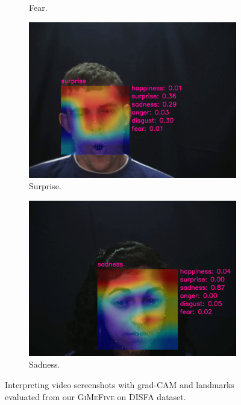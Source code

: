 \begin{figure}[ht]
\begin{subfigure}{0.49\linewidth}
    \caption{Fear.}
    \label{fig:v2}
  \end{subfigure}
  \hfill
  \begin{subfigure}{0.49\linewidth}
    \includegraphics[width=\linewidth]{GiMeFive03.png}
    \caption{Surprise.}
    \label{fig:v3}
  \end{subfigure}
  \hfill
  \begin{subfigure}{0.49\linewidth}
    \includegraphics[width=\linewidth]{GiMeFive04.png}
    \caption{Sadness.}
    \label{fig:v4}
  \end{subfigure}
  \caption{Interpreting video screenshots with grad-CAM and landmarks evaluated from our \textsc{GiMeFive} on DISFA dataset.}
  \label{fig:video}
\end{figure}

